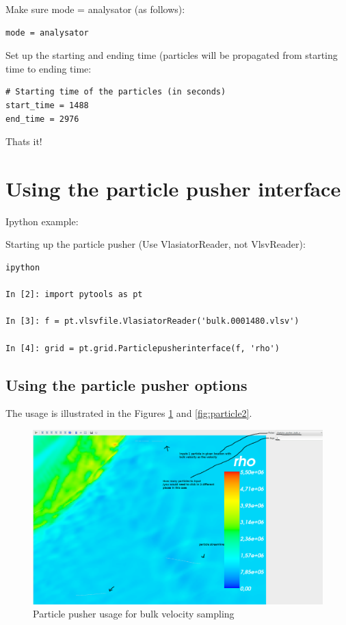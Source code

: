 \documentclass[a4paper,10pt]{article}
\begin{document}
Make sure mode = analysator (as follows):
\begin{verbatim}
mode = analysator
\end{verbatim}

Set up the starting and ending time (particles will be propagated from starting time to ending time:

\begin{verbatim}
# Starting time of the particles (in seconds)
start_time = 1488
end_time = 2976
\end{verbatim}

Thats it!

\section{Using the particle pusher interface}

Ipython example:

Starting up the particle pusher (Use VlasiatorReader, not VlsvReader):

\begin{verbatim}
ipython

In [2]: import pytools as pt

In [3]: f = pt.vlsvfile.VlasiatorReader('bulk.0001480.vlsv')

In [4]: grid = pt.grid.Particlepusherinterface(f, 'rho')
\end{verbatim}

\subsection{Using the particle pusher options}

The usage is illustrated in the Figures \ref{fig:particle1} and \ref{fig:particle2}.

\begin{figure}[H]
 \centering
 \includegraphics[width=\textwidth]{./images/particlepusherbulk.png}
 \caption{Particle pusher usage for bulk velocity sampling}
 \label{fig:particle1}
\end{figure}
\end{document}
